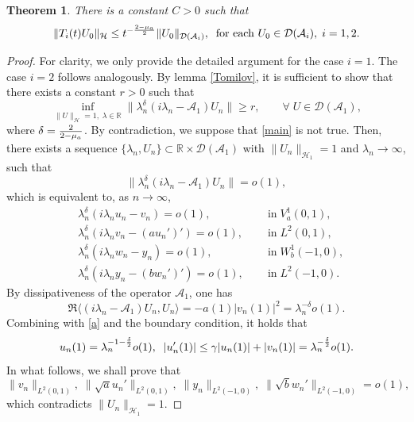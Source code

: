 \documentclass[twoside]{article}
\newtheorem{theorem}[definition]{Theorem}
\theoremstyle{noparens}
\theoremstyle{definition}
\numberwithin{equation}{section}
\numberwithin{figure}{section}
\begin{document}
\begin{theorem}
There is a constant $C>0$ such that
\begin{equation}
	\|T_i(t)U_0\|_{\mathcal H}\leq t^{-{2-\mu_a\over 2}}\|U_0\|_{\mathcal D(\mathcal A_i)},\;\;\mbox{for each }U_0\in\mathcal D(\mathcal A_i),\;i=1,2.
\end{equation}
\end{theorem}
\begin{proof}
For clarity, we only provide the detailed argument  for the case $i=1$. The case $i=2$ follows analogously. By lemma \ref{Tomilov}, it is sufficient to show that there exists a constant $r>0$ such that
\begin{equation}\label{main}
	\inf_{\|U\|_{\mathcal H}=1,\;\lambda\in\mathbb R}\|\lambda_n^{\delta}(i\lambda_n - \mathcal A_1)U_n\| \geq r,\qquad\forall\;U\in\mathcal D(\mathcal A_1),
\end{equation}
where $\delta = {2\over 2-\mu_a}$. By contradiction, we suppose that \eqref{main} is not true. Then, there exists a sequence $\{\lambda_n, U_n\}\subset\mathbb R \times \mathcal D(\mathcal A_1)$ with $\|U_n\|_{\mathcal H_1} = 1$ and $\lambda_n\rightarrow \infty$, such that
\begin{equation}
	\|\lambda_n^{\delta}(i\lambda_n - \mathcal A_1)U_n\| = o(1),
\end{equation}
which is equivalent to, as $n\rightarrow\infty$,
\begin{subequations}
	\begin{align}
		&\lambda_n^{\delta}(i\lambda_n u_n - v_n) = o(1),\;\;&&\mbox{in}\;V_a^1(0,1),\label{a}\\
		&\lambda_n^{\delta}(i\lambda_n v_n - (au_n')')= o(1),\;\;&&\mbox{in}\;L^2(0,1),\label{b}\\
		&\lambda_n^{\delta}(i\lambda_n w_n - y_n) = o(1),\;\;&&\mbox{in}\;W_b^1(-1,0),\label{c}\\
		&\lambda_n^{\delta}(i\lambda_n y_n - (bw_n')') = o(1),\;\;&&\mbox{in}\;L^2(-1,0).\label{d}
	\end{align}
\end{subequations}
By dissipativeness of the operator $\mathcal A_1$, one has
$$\Re\langle (i\lambda_n - \mathcal A_1)U_n , U_n \rangle = -a(1)|v_n(1)|^2 = \lambda_n^{-\delta}o(1).$$
Combining with \eqref{a} and the boundary condition, it holds that
\begin{equation}\label{bound-o(1)}
	u_n(1) = \lambda_n^{-1-{\delta\over 2}}o(1),\;\;
	\left|u_n'(1)\right| \leq \gamma|u_n(1)| + |v_n(1)| = \lambda_n^{-{\delta\over2}}o(1).
\end{equation}
In what follows, we shall prove that
$$\|v_n\|_{L^2(0,1)},\;
\|\sqrt{a}u_n'\|_{L^2(0,1)},\;
\|y_n\|_{L^2(-1,0)},\;
\|\sqrt{b}w_n'\|_{L^2(-1,0)}
=o(1),$$
which contradicts $\|U_n\|_{\mathcal H_1} = 1$.


\end{proof}
\end{document}
